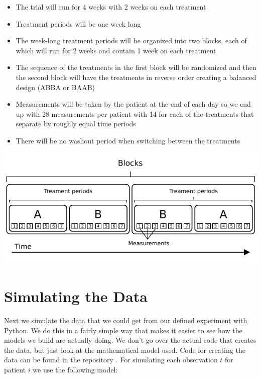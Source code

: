 \documentclass[12pt,a4paper,leqno]{report}
\theoremstyle{plain}
\theoremstyle{definition}
\theoremstyle{remark}
\begin{document}
\begin{itemize}
    \item The trial will run for 4 weeks with 2 weeks on each treatment
    \item Treatment periods will be one week long
    \item The week-long treatment periods will be organized into two blocks, each of which will run for
    2 weeks and contain 1 week on each treatment
    \item The sequence of the treatments in the first block will be randomized and then
    the second block will have the treatments in reverse order creating a balanced
    design (ABBA or BAAB)
    \item Measurements will be taken by the patient at the end of each day so we end up with
    28 measurements per patient with 14 for each of the treatments that separate by
    roughly equal time periods
    \item There will be no washout period when switching between the treatments
\end{itemize}

\bigskip
{
    \centering
    \includegraphics{design_for_simulated_experiment.pdf}
    \par
}
\bigskip


\section{Simulating the Data}

Next we simulate the data that we could get from our defined experiment with Python.
We do this in a fairly simple way that makes it easier to see how the models we build are
actually doing. We don't go over the actual code that creates the data, but just look at
the mathematical model used. Code for creating the data can be found in the repository
\cite{github}. For simulating each observation \(t\) for patient \(i\) we use the following model:
\end{document}
